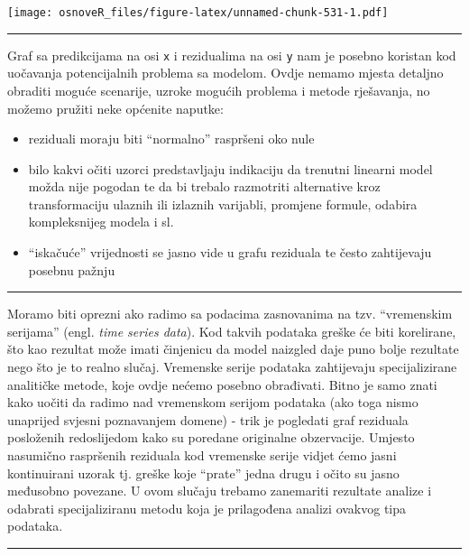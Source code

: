 \documentclass[]{book}
\providecommand{\tightlist}{%
  \setlength{\itemsep}{0pt}\setlength{\parskip}{0pt}}
\theoremstyle{definition}
\theoremstyle{definition}
\theoremstyle{definition}
\theoremstyle{remark}
\begin{document}
\texttt{[image: osnoveR\_files/figure-latex/unnamed-chunk-531-1.pdf]}

\begin{center}\rule{0.5\linewidth}{\linethickness}\end{center}

Graf sa predikcijama na osi \texttt{x} i rezidualima na osi \texttt{y}
nam je posebno koristan kod uočavanja potencijalnih problema sa modelom.
Ovdje nemamo mjesta detaljno obraditi moguće scenarije, uzroke mogućih
problema i metode rješavanja, no možemo pružiti neke općenite naputke:

\begin{itemize}
\tightlist
\item
  reziduali moraju biti ``normalno'' raspršeni oko nule
\item
  bilo kakvi očiti uzorci predstavljaju indikaciju da trenutni linearni
  model možda nije pogodan te da bi trebalo razmotriti alternative kroz
  transformaciju ulaznih ili izlaznih varijabli, promjene formule,
  odabira kompleksnijeg modela i sl.
\item
  ``iskačuće'' vrijednosti se jasno vide u grafu reziduala te često
  zahtijevaju posebnu pažnju
\end{itemize}

\begin{center}\rule{0.5\linewidth}{\linethickness}\end{center}

Moramo biti oprezni ako radimo sa podacima zasnovanima na tzv.
``vremenskim serijama'' (engl. \emph{time series data}). Kod takvih
podataka greške će biti korelirane, što kao rezultat može imati
činjenicu da model naizgled daje puno bolje rezultate nego što je to
realno slučaj. Vremenske serije podataka zahtijevaju specijalizirane
analitičke metode, koje ovdje nećemo posebno obrađivati. Bitno je samo
znati kako uočiti da radimo nad vremenskom serijom podataka (ako toga
nismo unaprijed svjesni poznavanjem domene) - trik je pogledati graf
reziduala posloženih redoslijedom kako su poredane originalne
obzervacije. Umjesto nasumično raspršenih reziduala kod vremenske serije
vidjet ćemo jasni kontinuirani uzorak tj. greške koje ``prate'' jedna
drugu i očito su jasno međusobno povezane. U ovom slučaju trebamo
zanemariti rezultate analize i odabrati specijaliziranu metodu koja je
prilagođena analizi ovakvog tipa podataka.

\begin{center}\rule{0.5\linewidth}{\linethickness}\end{center}
\end{document}

